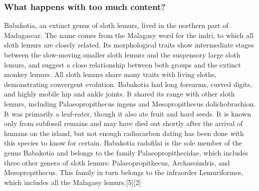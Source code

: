 \documentclass[handout,aspectratio=169]{beamer}
\begin{document}
\begin{frame}[allowframebreaks]
    \frametitle{What happens with too much content?}

    Babakotia, an extinct genus of sloth lemurs, lived in the northern part of
    Madagascar. The name comes from the Malagasy word for the indri, to which
    all sloth lemurs are closely related. Its morphological traits show
    intermediate stages between the slow-moving smaller sloth lemurs and the
    suspensory large sloth lemurs, and suggest a close relationship between
    both groups and the extinct monkey lemurs. All sloth lemurs share many
    traits with living sloths, demonstrating convergent evolution. Babakotia
    had long forearms, curved digits, and highly mobile hip and ankle joints.
    It shared its range with other sloth lemurs, including Palaeopropithecus
    ingens and Mesopropithecus dolichobrachion. It was primarily a leaf-eater,
    though it also ate fruit and hard seeds. It is known only from subfossil
    remains and may have died out shortly after the arrival of humans on the
    island, but not enough radiocarbon dating has been done with this species
    to know for certain. Babakotia radofilai is the sole member of the genus
    Babakotia and belongs to the family Palaeopropithecidae, which includes
    three other genera of sloth lemurs: Palaeopropithecus, Archaeoindris, and
    Mesopropithecus. This family in turn belongs to the infraorder
    Lemuriformes, which includes all the Malagasy lemurs.[5][2]

\end{frame}





\end{document}
